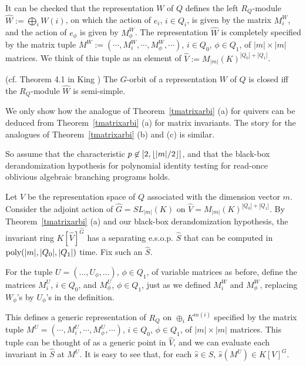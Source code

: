 \documentclass[11pt]{article}
\begin{document}
It can be checked that the  representation $W$ of $Q$ defines the  left $R_Q$-module
$\hat W := \bigoplus_i W(i)$,
on which the action of $e_i$, $i \in Q_i$, is given by the matrix $M^W_i$,
and  the action of $e_\phi$ is given by $M^W_\phi$.
The representation $\hat W$ is completely specified by the matrix tuple 
$M^W:=(\cdots, M^W_i, \cdots, M^W_\phi, \cdots)$, $i \in Q_0$, $\phi \in Q_1$, of
$|m| \times |m|$ matrices.
We think of this tuple  as an element of  
$\hat V := M_{|m|}(K)^{|Q_0| +|Q_1|}$.



\begin{theorem} (cf. Theorem 4.1 in King \cite{king}) \label{tkingquiver}
The $G$-orbit of a representation $W$ of $Q$ is closed iff
the $R_Q$-module $\hat W$ is semi-simple.
\end{theorem}

We  only show how the analogue of Theorem~\ref{tmatrixarbi} (a)
for quivers can be deduced from Theorem~\ref{tmatrixarbi} (a) for
matrix invariants.
The story for the analogues of Theorem~\ref{tmatrixarbi} (b) and (c)
 is similar.

So assume that the characteristic
$p \not \in [2,{\lfloor |m|/2 \rfloor}]$, and that 
the  black-box derandomization hypothesis 
for polynomial identity testing for read-once oblivious algebraic branching 
programs  holds. 

Let $V$ be the representation space of $Q$ associated with the dimension vector $m$.
Consider the adjoint action of $\hat G=SL_{|m|}(K)$
on $\hat V = M_{|m|}(K)^{|Q_0| +|Q_1|}$. By Theorem~\ref{tmatrixarbi} (a)
and our black-box derandomization hypothesis, 
the invariant ring $K[\hat V]^{\hat G}$ has a separating 
e.s.o.p. $\hat S$ that  can be computed in ${\mbox {poly}}(|m|,|Q_0|,|Q_1|)$ time.
Fix such an $\hat S$.

For the tuple  $U=(\ldots,U_\phi,\ldots)$, $\phi \in Q_1$, of 
variable  matrices as before, define
the matrices $M^U_i$, $i \in Q_0$, and $M^U_\phi$, $\phi \in Q_1$, just as
we defined $M^W_i$ and $M^W_\phi$, 
replacing $W_\phi$'s by $U_\phi$'s in the definition.

This defines a generic representation of $R_Q$ on $\oplus_i K^{m(i)}$ specified
by  the matrix tuple
$M^U=(\cdots, M^U_i, \cdots, M^U_\phi, \cdots)$, $i \in Q_0$, $\phi \in Q_1$, 
of $|m|\times |m|$ matrices. This tuple can be 
thought of as a generic point   in $\hat V$, and  we can evaluate each invariant in
$\hat S$ at $M^U$. 
It is easy to see  that, for each $\hat s \in \hat S$, $\hat s(M^U) \in K[V]^G$. 
\end{document}
